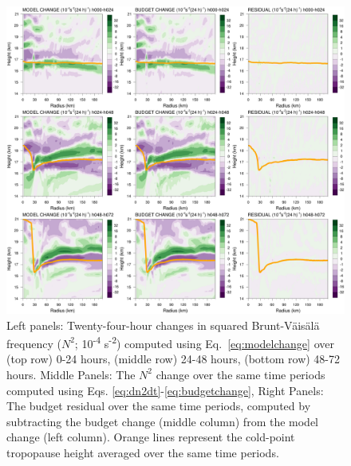 \begin{figure}[ht]
\centerline{\includegraphics[width=39pc]{figures/mod+bud+res.png}}
\caption{Left panels: Twenty-four-hour changes in squared Brunt-V{\"a}is{\"a}l{\"a} frequency ($N^2$; 10\textsuperscript{-4} s\textsuperscript{-2}) computed using Eq.~\ref{eq:modelchange} over (top row) 0-24 hours, (middle row) 24-48 hours, (bottom row) 48-72 hours.
Middle Panels: The $N^2$ change over the same time periods computed using Eqs. \ref{eq:dn2dt}-\ref{eq:budgetchange}, %
Right Panels: The budget residual over the same time periods, computed by subtracting the budget change (middle column) from the model change (left column).
Orange lines represent the cold-point tropopause height averaged over the same time periods.}
\label{fig:mod+bud+res}
\end{figure}

